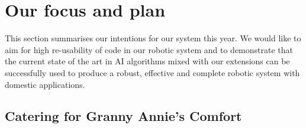  
\section{Our focus and plan}

This section summarises our intentions for our system this year. We would like to aim for high re-usability of code in our robotic system and to demonstrate that the current state of the art in AI algorithms mixed with our extensions can be successfully used to produce a robust, effective and complete robotic system with domestic applications.  

\subsection{Catering for Granny Annie’s Comfort}





